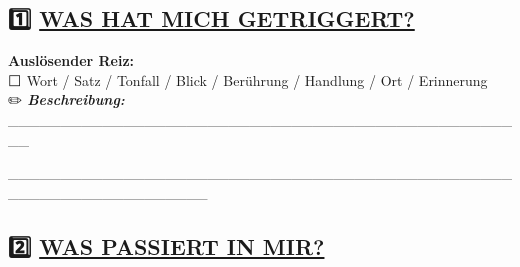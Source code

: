 \hypertarget{section-1}{%
\subsection{}\label{section-1}}

\hypertarget{was-hat-mich-getriggert}{%
\subsection{\texorpdfstring{1️⃣ \textbf{\ul{WAS HAT MICH GETRIGGERT?}}}{1️⃣ WAS HAT MICH GETRIGGERT?}}\label{was-hat-mich-getriggert}}

\textbf{Auslösender Reiz:}\\
⬜ Wort / Satz / Tonfall / Blick / Berührung / Handlung / Ort / Erinnerung\\
✏️ \emph{\textbf{Beschreibung:}} \_\_\_\_\_\_\_\_\_\_\_\_\_\_\_\_\_\_\_\_\_\_\_\_\_\_\_\_\_\_\_\_\_\_\_\_\_\_\_\_\_\_\_\_\_\_\_\_\_\_

\_\_\_\_\_\_\_\_\_\_\_\_\_\_\_\_\_\_\_\_\_\_\_\_\_\_\_\_\_\_\_\_\_\_\_\_\_\_\_\_\_\_\_\_\_\_\_\_\_\_\_\_\_\_\_\_\_\_\_\_\_\_\_\_\_\_\_

\hypertarget{section-2}{%
\subsection{}\label{section-2}}

\hypertarget{section-3}{%
\subsection{}\label{section-3}}

\hypertarget{was-passiert-in-mir-1}{%
\subsection{\texorpdfstring{2️⃣ \textbf{\ul{WAS PASSIERT IN MIR?}}}{2️⃣ WAS PASSIERT IN MIR?}}\label{was-passiert-in-mir-1}}

